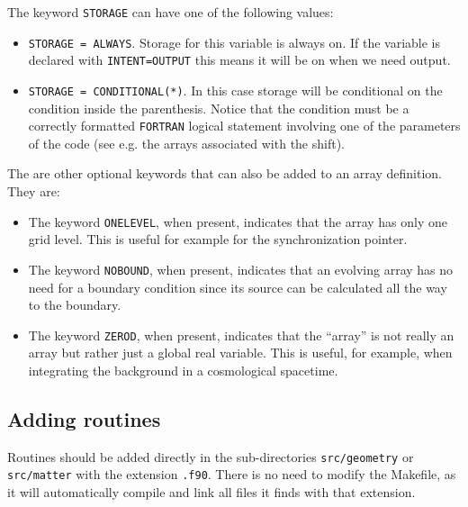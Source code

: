 \documentclass[12pt]{article}
\begin{document}
The keyword \texttt{STORAGE} can have one of the following values:

\begin{itemize}

\item \texttt{STORAGE = ALWAYS}.  Storage for this variable is always
  on.  If the variable is declared with \texttt{INTENT=OUTPUT} this means it will
  be on when we need output.

\item \texttt{STORAGE = CONDITIONAL(*)}.  In this case storage will be
  conditional on the condition inside the parenthesis.  Notice that
  the condition must be a correctly formatted \texttt{FORTRAN} logical
  statement involving one of the parameters of the code (see
  e.g. the arrays associated with the shift).

\end{itemize}

\vspace{3mm}

The are other optional keywords that can also be added to an array
definition. They are:

\begin{itemize}

\item The keyword \texttt{ONELEVEL}, when present, indicates that the
  array has only one grid level.  This is useful for example for the
  synchronization pointer.

\item The keyword \texttt{NOBOUND}, when present, indicates that an
  evolving array has no need for a boundary condition since its source
  can be calculated all the way to the boundary.

\item The keyword \texttt{ZEROD}, when present, indicates that the
  ``array'' is not really an array but rather just a global real
  variable. This is useful, for example, when integrating the
  background in a cosmological spacetime.

\end{itemize}

\vspace{3mm}


\subsection{Adding routines}

Routines should be added directly in the sub-directories
\texttt{src/geometry} or \texttt{src/matter} with the extension
\texttt{.f90}.  There is no need to modify the Makefile, as it will
automatically compile and link all files it finds with that
extension. \\
\end{document}
